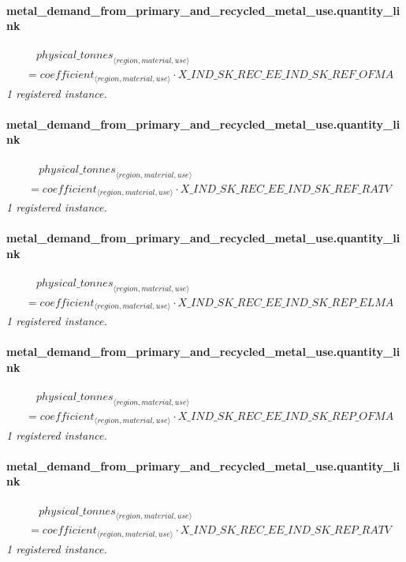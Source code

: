 \documentclass[11pt]{article}
\begin{document}
\paragraph{metal\_demand\_from\_primary\_and\_recycled\_metal\_use.quantity\_link}
\begin{align*}
&\quad {physical\_tonnes}_{\langle region, material, use\rangle}\\
&= coefficient_{\langle region, material, use\rangle} \cdot X\_IND\_SK\_REC\_EE\_IND\_SK\_REF\_OFMA
\end{align*}
\noindent\emph{1 registered instance.}\par
\paragraph{metal\_demand\_from\_primary\_and\_recycled\_metal\_use.quantity\_link}
\begin{align*}
&\quad {physical\_tonnes}_{\langle region, material, use\rangle}\\
&= coefficient_{\langle region, material, use\rangle} \cdot X\_IND\_SK\_REC\_EE\_IND\_SK\_REF\_RATV
\end{align*}
\noindent\emph{1 registered instance.}\par
\paragraph{metal\_demand\_from\_primary\_and\_recycled\_metal\_use.quantity\_link}
\begin{align*}
&\quad {physical\_tonnes}_{\langle region, material, use\rangle}\\
&= coefficient_{\langle region, material, use\rangle} \cdot X\_IND\_SK\_REC\_EE\_IND\_SK\_REP\_ELMA
\end{align*}
\noindent\emph{1 registered instance.}\par
\paragraph{metal\_demand\_from\_primary\_and\_recycled\_metal\_use.quantity\_link}
\begin{align*}
&\quad {physical\_tonnes}_{\langle region, material, use\rangle}\\
&= coefficient_{\langle region, material, use\rangle} \cdot X\_IND\_SK\_REC\_EE\_IND\_SK\_REP\_OFMA
\end{align*}
\noindent\emph{1 registered instance.}\par
\paragraph{metal\_demand\_from\_primary\_and\_recycled\_metal\_use.quantity\_link}
\begin{align*}
&\quad {physical\_tonnes}_{\langle region, material, use\rangle}\\
&= coefficient_{\langle region, material, use\rangle} \cdot X\_IND\_SK\_REC\_EE\_IND\_SK\_REP\_RATV
\end{align*}
\noindent\emph{1 registered instance.}\par
\end{document}
